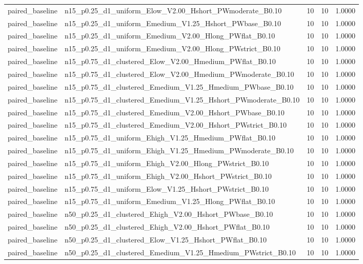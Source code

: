 \begin{tabular}{llrrr}
paired_baseline & n15_p0.25_d1_uniform_Elow_V2.00_Hshort_PWmoderate_B0.10 & 10 & 10 & 1.0000 \\
paired_baseline & n15_p0.25_d1_uniform_Emedium_V1.25_Hshort_PWbase_B0.10 & 10 & 10 & 1.0000 \\
paired_baseline & n15_p0.25_d1_uniform_Emedium_V2.00_Hlong_PWflat_B0.10 & 10 & 10 & 1.0000 \\
paired_baseline & n15_p0.25_d1_uniform_Emedium_V2.00_Hlong_PWstrict_B0.10 & 10 & 10 & 1.0000 \\
paired_baseline & n15_p0.75_d1_clustered_Elow_V2.00_Hmedium_PWflat_B0.10 & 10 & 10 & 1.0000 \\
paired_baseline & n15_p0.75_d1_clustered_Elow_V2.00_Hmedium_PWmoderate_B0.10 & 10 & 10 & 1.0000 \\
paired_baseline & n15_p0.75_d1_clustered_Emedium_V1.25_Hmedium_PWbase_B0.10 & 10 & 10 & 1.0000 \\
paired_baseline & n15_p0.75_d1_clustered_Emedium_V1.25_Hshort_PWmoderate_B0.10 & 10 & 10 & 1.0000 \\
paired_baseline & n15_p0.75_d1_clustered_Emedium_V2.00_Hshort_PWbase_B0.10 & 10 & 10 & 1.0000 \\
paired_baseline & n15_p0.75_d1_clustered_Emedium_V2.00_Hshort_PWstrict_B0.10 & 10 & 10 & 1.0000 \\
paired_baseline & n15_p0.75_d1_uniform_Ehigh_V1.25_Hmedium_PWflat_B0.10 & 10 & 10 & 1.0000 \\
paired_baseline & n15_p0.75_d1_uniform_Ehigh_V1.25_Hmedium_PWmoderate_B0.10 & 10 & 10 & 1.0000 \\
paired_baseline & n15_p0.75_d1_uniform_Ehigh_V2.00_Hlong_PWstrict_B0.10 & 10 & 10 & 1.0000 \\
paired_baseline & n15_p0.75_d1_uniform_Ehigh_V2.00_Hshort_PWstrict_B0.10 & 10 & 10 & 1.0000 \\
paired_baseline & n15_p0.75_d1_uniform_Elow_V1.25_Hshort_PWstrict_B0.10 & 10 & 10 & 1.0000 \\
paired_baseline & n15_p0.75_d1_uniform_Emedium_V1.25_Hlong_PWflat_B0.10 & 10 & 10 & 1.0000 \\
paired_baseline & n50_p0.25_d1_clustered_Ehigh_V2.00_Hshort_PWbase_B0.10 & 10 & 10 & 1.0000 \\
paired_baseline & n50_p0.25_d1_clustered_Ehigh_V2.00_Hshort_PWflat_B0.10 & 10 & 10 & 1.0000 \\
paired_baseline & n50_p0.25_d1_clustered_Elow_V1.25_Hshort_PWflat_B0.10 & 10 & 10 & 1.0000 \\
paired_baseline & n50_p0.25_d1_clustered_Emedium_V1.25_Hmedium_PWstrict_B0.10 & 10 & 10 & 1.0000 \\

\end{tabular}
